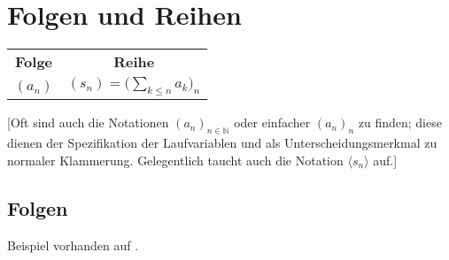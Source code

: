 \chapter{Folgen und Reihen}

\noindent\begin{center}
    \begin{tabular}{cc}
    	\textbf{Folge} &               \textbf{Reihe}                \\
    	   $(a_n)$     & $(s_n) = \bigl(\sum_{k \leq n} a_k\bigr)_n$
    \end{tabular}
\end{center}

[Oft sind auch die Notationen $(a_n)_{n \in \mathbb{N}}$ oder einfacher $(a_n)_n$ zu finden; diese dienen der Spezifikation der Laufvariablen und als Unterscheidungsmerkmal zu normaler Klammerung.
Gelegentlich taucht auch die Notation $\langle s_n \rangle$ auf.]

\section{Folgen}

\CheckedBox{} Beispiel vorhanden auf .

